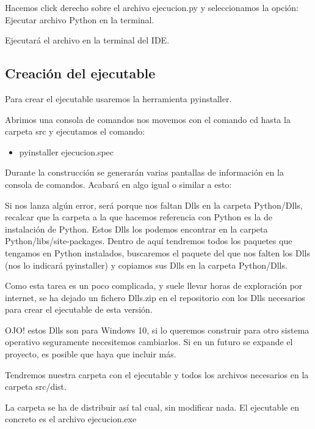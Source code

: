 Hacemos click derecho sobre el archivo ejecucion.py y seleccionamos la opción: Ejecutar archivo Python en la terminal.

Ejecutará el archivo en la terminal del IDE.

\subsection{Creación del ejecutable}
Para crear el ejecutable usaremos la herramienta pyinstaller.

Abrimos una consola de comandos nos movemos con el comando cd hasta la carpeta src y ejecutamos el comando:

\begin{itemize}
	\item pyinstaller ejecucion.spec
\end{itemize}


Durante la construcción se generarán varias pantallas de información en la consola de comandos. Acabará en algo igual o similar a esto:


Si nos lanza algún error, será porque nos faltan Dlls en la carpeta Python/Dlls, recalcar que la carpeta a la que hacemos referencia con Python es la de instalación de Python. Estos Dlls los podemos encontrar en la carpeta Python/libs/site-packages. Dentro de aquí tendremos todos los paquetes que tengamos en Python instalados, buscaremos el paquete del que nos falten los Dlls (nos lo indicará pyinstaller) y copiamos sus Dlls en la carpeta Python/Dlls.

Como esta tarea es un poco complicada, y suele llevar horas de exploración por internet, se ha dejado un fichero Dlls.zip en el repositorio con los Dlls necesarios para crear el ejecutable de esta versión.

OJO! estos Dlls son para Windows 10, si lo queremos construir para otro sistema operativo seguramente necesitemos cambiarlos. Si en un futuro se expande el proyecto, es posible que haya que incluir más.

Tendremos nuestra carpeta con el ejecutable y todos los archivos necesarios en la carpeta src/dist.

La carpeta se ha de distribuir así tal cual, sin modificar nada. El ejecutable en concreto es el archivo ejecucion.exe

